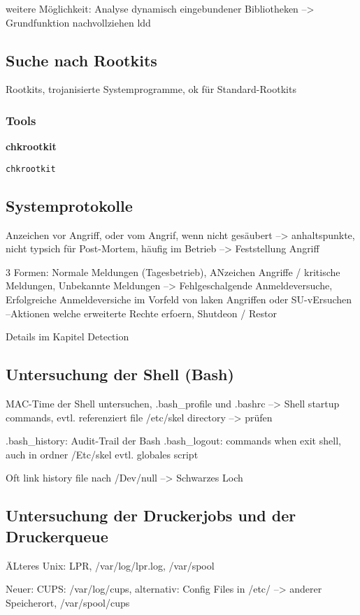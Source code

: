 weitere Möglichkeit: Analyse dynamisch eingebundener Bibliotheken --> Grundfunktion nachvollziehen
ldd

\subsection{Suche nach Rootkits}
Rootkits, trojanisierte Systemprogramme, ok für Standard-Rootkits

\subsubsection{Tools}
\textbf{chkrootkit}\\
\begin{verbatim}
chkrootkit
\end{verbatim}

\subsection{Systemprotokolle}
Anzeichen vor Angriff, oder vom Angrif, wenn nicht gesäubert --> anhaltspunkte, nicht typsich für Post-Mortem, häufig im Betrieb --> Feststellung Angriff

3 Formen: Normale Meldungen (Tagesbetrieb), ANzeichen Angriffe / kritische Meldungen, Unbekannte Meldungen
--> Fehlgeschalgende Anmeldeversuche, Erfolgreiche Anmeldeversiche im Vorfeld von laken Angriffen oder SU-vErsuchen
--Aktionen welche erweiterte Rechte erfoern, Shutdeon / Restor

Details im Kapitel Detection


\subsection{Untersuchung der Shell (Bash)}
MAC-Time der Shell untersuchen, .bash\_profile und .bashrc --> Shell startup commands, evtl. referenziert file /etc/skel directory --> prüfen

.bash\_history: Audit-Trail der Bash
.bash\_logout: commands when exit shell, auch in ordner /Etc/skel evtl. globales script

Oft link history file nach /Dev/null --> Schwarzes Loch

\subsection{Untersuchung der Druckerjobs und der Druckerqueue}
ÄLteres Unix: LPR, /var/log/lpr.log, /var/spool

Neuer: CUPS: /var/log/cups, alternativ: Config Files in /etc/ --> anderer Speicherort, /var/spool/cups

